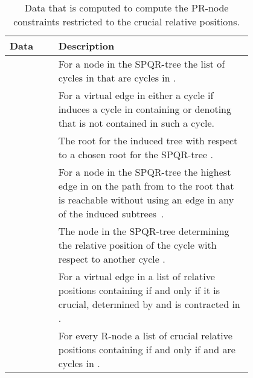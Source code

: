 \documentclass{scrartcl}
\newcommand{\1}[1]{{\normalfont \ensuremath{#1^{\tiny\circled{1}}}}} \newcommand{\2}[1]{{\normalfont \ensuremath{#1^{\tiny\circled{2}}}}} \renewcommand{\k}[1]{{\normalfont \ensuremath{#1^{\tiny\circled{k}}}}} \newcommand{\proj}[2]{\ensuremath{\left.#1\right|_{#2}}} \newcommand{\eps}{\varepsilon}
\theoremstyle{plain} \newtheorem{theorem}{Theorem} \newcounter{lemmacounter} \setcounter{lemmacounter}{0} \newtheorem{lemma}[lemmacounter]{Lemma} \newtheorem{fact}{Fact}  \newtheorem{corollary}{Corollary} \theoremstyle{definition} \newtheorem{definition}{Definition}
\begin{document}
\begin{table}
  \heavyrulewidth=1pt
  \centering
  \begin{tabular}{lp{0.8\linewidth}}
    \toprule
    {\bf Data} & {\bf Description}  \\
    \midrule
     & For a node  in the SPQR-tree the list of cycles
    in  that are cycles in .  \\
    \midrule
     & For a virtual edge  in  either a
    cycle  if  induces a cycle in 
    containing  or  denoting that  is not contained
    in such a cycle.  \\
    \midrule
     & The root for the induced tree
     with respect to a chosen root for the
    SPQR-tree .  \\
    \midrule
      &  For a node  in the SPQR-tree 
    the highest edge in  on the path from  to the
    root that is reachable without using an edge in any of the induced
    subtrees~.  \\
    \midrule
     & The node in the SPQR-tree determining the
    relative position  of the cycle  with respect to
    another cycle .  \\
    \midrule
     & For a virtual edge  in  a list
    of relative positions containing  if and only if it is
    crucial, determined by  and  is contracted in .  \\
    \midrule
     & For every R-node  a list of crucial relative
    positions containing  if and only if  and  are
    cycles in . \\
    \bottomrule
\end{tabular}
\caption{Data that is computed to compute the PR-node constraints
  restricted to the crucial relative positions.}
\label{tab:data}
\end{table}
\end{document}
